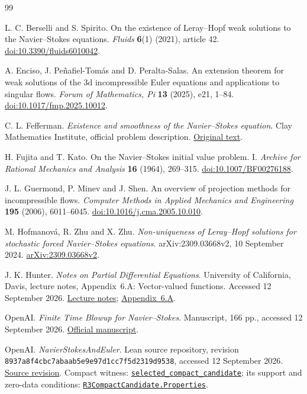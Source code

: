 \begin{thebibliography}{99}\small\raggedright
{}
L. C. Berselli and S. Spirito. On the existence of Leray--Hopf weak solutions to the Navier--Stokes equations.
\emph{Fluids} \textbf{6}(1) (2021), article 42.
\href{https://doi.org/10.3390/fluids6010042}{doi:10.3390/fluids6010042}.

A. Enciso, J. Pe\~nafiel-Tom\'as and D. Peralta-Salas.
An extension theorem for weak solutions of the 3d incompressible Euler
equations and applications to singular flows.
\emph{Forum of Mathematics, Pi} \textbf{13} (2025), e21, 1--84.
\href{https://doi.org/10.1017/fmp.2025.10012}{doi:10.1017/fmp.2025.10012}.

C. L. Fefferman. \emph{Existence and smoothness of the Navier--Stokes equation}.
Clay Mathematics Institute, official problem description.
\href{https://www.claymath.org/wp-content/uploads/2022/06/navierstokes.pdf}{Original text}.

H. Fujita and T. Kato. On the Navier--Stokes initial value problem. I.
\emph{Archive for Rational Mechanics and Analysis} \textbf{16} (1964), 269--315.
\href{https://doi.org/10.1007/BF00276188}{doi:10.1007/BF00276188}.

J. L. Guermond, P. Minev and J. Shen. An overview of projection methods for incompressible flows.
\emph{Computer Methods in Applied Mechanics and Engineering} \textbf{195} (2006), 6011--6045.
\href{https://doi.org/10.1016/j.cma.2005.10.010}{doi:10.1016/j.cma.2005.10.010}.

M. Hofmanov\'a, R. Zhu and X. Zhu.
\emph{Non-uniqueness of Leray--Hopf solutions for stochastic forced Navier--Stokes equations}.
arXiv:2309.03668v2, 10 September 2024.
\href{https://arxiv.org/abs/2309.03668v2}{arXiv:2309.03668v2}.

J. K. Hunter. \emph{Notes on Partial Differential Equations}.
University of California, Davis, lecture notes, Appendix~6.A:
Vector-valued functions. Accessed 12 September 2026.
\href{https://www.math.ucdavis.edu/~hunter/pdes/pdes.html}{Lecture notes};
\href{https://www.math.ucdavis.edu/~hunter/pdes/ch6A.pdf}{Appendix~6.A}.

OpenAI. \emph{Finite Time Blowup for Navier--Stokes}. Manuscript, 166 pp., accessed 12 September 2026.
\href{https://cdn.openai.com/pdf/32d9f210-8b73-45e0-91bc-82a30aef8a9a/navier-stokes.pdf}{Official manuscript}.

OpenAI. \emph{NavierStokesAndEuler}. Lean source repository, revision
\texttt{8937a8f4cbc7abaab5e9e97d1cc7f5d2319d9538}, accessed 12 September 2026.
\href{https://github.com/openai/NavierStokesAndEuler/tree/8937a8f4cbc7abaab5e9e97d1cc7f5d2319d9538}{Source revision}.
Compact witness: \href{https://github.com/openai/NavierStokesAndEuler/blob/8937a8f4cbc7abaab5e9e97d1cc7f5d2319d9538/NavierStokes/R3ActualCandidate.lean#L18-L21}{\texttt{selected\_compact\_candidate}};
its support and zero-data conditions: \href{https://github.com/openai/NavierStokesAndEuler/blob/8937a8f4cbc7abaab5e9e97d1cc7f5d2319d9538/NavierStokes/R3CompactCandidate.lean#L24-L37}{\texttt{R3CompactCandidate.Properties}}.


\end{thebibliography}
